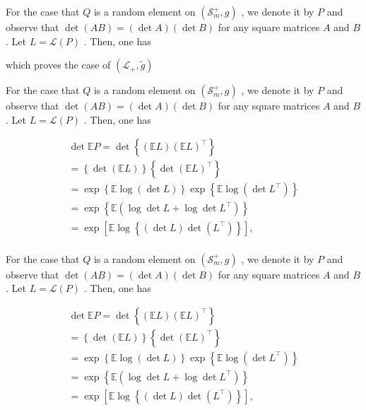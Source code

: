 \documentclass[11pt]{article}
\begin{document}
For the case that  $Q$  is a random element on  $(\mathcal{S}_m^+, g)$ , we denote it by  $P$  and observe that  $\operatorname{det}(AB) = (\operatorname{det} A)(\operatorname{det} B)$  for any square matrices  $A$  and  $B$ . Let  $L = \mathcal{L}(P)$ . Then, one has

which proves the case of  $(\mathcal{L}_{+},\tilde{g})$

For the case that  $Q$  is a random element on  $(\mathcal{S}_m^+, g)$ , we denote it by  $P$  and observe that  $\operatorname{det}(AB) = (\operatorname{det} A)(\operatorname{det} B)$  for any square matrices  $A$  and  $B$ . Let  $L = \mathcal{L}(P)$ . Then, one has

$$
\begin{array}{l} \det  \mathbb {E} P = \det  \left\{\left(\mathbb {E} L\right) \left(\mathbb {E} L\right) ^ {\top} \right\} \\ = \left\{\det  (\mathbb {E} L) \right\} \left\{\det  (\mathbb {E} L) ^ {\top} \right\} \\ = \exp \left\{\mathbb {E} \log (\det  L) \right\} \exp \left\{\mathbb {E} \log (\det  L ^ {\top}) \right\} \\ = \exp \left\{\mathbb {E} \left(\log \det  L + \log \det  L ^ {\top}\right) \right\} \\ = \exp \left[ \mathbb {E} \log \left\{\left(\det  L\right) \det  \left(L ^ {\top}\right) \right\} \right], \\ \end{array}
$$

For the case that  $Q$  is a random element on  $(\mathcal{S}_m^+, g)$ , we denote it by  $P$  and observe that  $\operatorname{det}(AB) = (\operatorname{det} A)(\operatorname{det} B)$  for any square matrices  $A$  and  $B$ . Let  $L = \mathcal{L}(P)$ . Then, one has

$$
\begin{array}{l} \det  \mathbb {E} P = \det  \left\{\left(\mathbb {E} L\right) \left(\mathbb {E} L\right) ^ {\top} \right\} \\ = \left\{\det  (\mathbb {E} L) \right\} \left\{\det  (\mathbb {E} L) ^ {\top} \right\} \\ = \exp \left\{\mathbb {E} \log (\det  L) \right\} \exp \left\{\mathbb {E} \log (\det  L ^ {\top}) \right\} \\ = \exp \left\{\mathbb {E} \left(\log \det  L + \log \det  L ^ {\top}\right) \right\} \\ = \exp \left[ \mathbb {E} \log \left\{\left(\det  L\right) \det  \left(L ^ {\top}\right) \right\} \right], \\ \end{array}
$$
\end{document}
